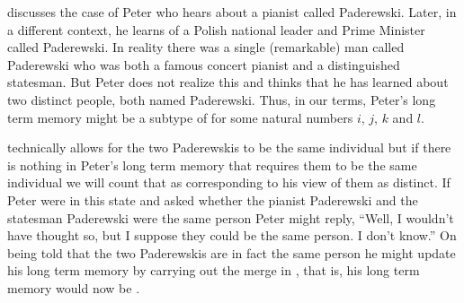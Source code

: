 \cite{Kripke1979} discusses the case of Peter who hears about a
pianist called Paderewski.  Later, in a different
context, he learns of a Polish national leader and Prime Minister
called Paderewski.  In reality there was a single (remarkable) man
called Paderewski who was both a famous concert pianist and a
distinguished statesman.  But Peter does not realize this and thinks
that he has learned about two distinct people, both named Paderewski.
Thus, in our terms, Peter's long term memory might be a subtype of
\nexteg{} for some natural numbers $i$, $j$, $k$ and $l$.
\begin{ex} 
\label{ex:paderewski-unlinked}
\end{ex} 
\preveg{} technically allows for the two Paderewskis to be the same
individual but if there is nothing in Peter's long term memory that
requires them to be the same individual we will count that as
corresponding to his view of them as distinct.  If Peter were in this
state and asked whether the pianist Paderewski and the statesman
Paderewski were the same person Peter might reply, ``Well, I wouldn't
have thought so, but I suppose they could be the same person.  I don't
know.''  On being told that the two Paderewskis are in fact the same
person he might update his long term memory by carrying out the 
merge in , that is, his long term memory would now be
.
